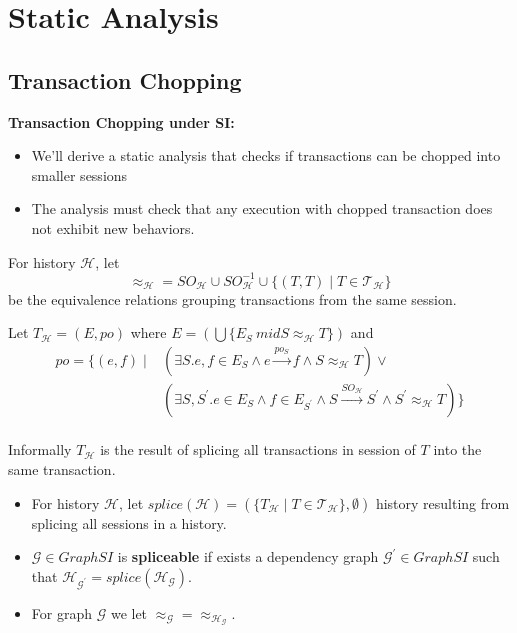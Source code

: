 \documentclass{beamer}
\begin{document}
\section{Static Analysis}
\subsection{Transaction Chopping}

\begin{frame}
	\textbf{Transaction Chopping under SI:}
	\begin{itemize}
		\item We'll derive a static analysis that checks if transactions can be chopped into smaller sessions
		\item The analysis must check that any execution with chopped transaction does not exhibit new behaviors.
	\end{itemize}
\end{frame}


\begin{frame}
	For history $\mathcal{H}$, let
	$$ \approx_\mathcal{H} = SO_\mathcal{H} \cup SO^{-1}_\mathcal{H} \cup \{ (T,T) \mid T \in \mathcal{T}_\mathcal{H}\}$$
	be the equivalence relations grouping transactions from the same session.
\end{frame}

\begin{frame}
	Let $\boxed{T}_\mathcal{H} = (E, po)$ where 
	$ E = \left(\bigcup \{E_S \ mid S \approx_\mathcal{H} T \} \right) $
	and
	$$
	\begin{aligned}
		po = \{ (e,f) \mid & \left( \exists S . e,f \in E_S \wedge e \xrightarrow{po_S} f \wedge S \approx_\mathcal{H} T \right) \vee \\ 
		                   & \left( \exists S, S^\prime . e\in E_S \wedge f \in E_{S^\prime} \wedge S \xrightarrow{SO_\mathcal{H}} S^\prime \wedge S^\prime \approx_\mathcal{H} T \right) \}
	\end{aligned}
	$$
	\\
	Informally $\boxed{T}_\mathcal{H}$ is the result of splicing all transactions in session of $T$ into the same transaction.
\end{frame}

\begin{frame}
	\begin{itemize}
		\item	For history $\mathcal{H}$, let $splice(\mathcal{H})=\left( \{ \boxed{T}_\mathcal{H} \mid T \in \mathcal{T}_\mathcal{H} \}, \emptyset \right)$ history resulting from splicing all sessions in a history.
		\item $\mathcal{G} \in GraphSI $ is \textbf{spliceable} if exists a dependency graph $ \mathcal{G}^\prime \in GraphSI $ such that $ \mathcal{H}_{\mathcal{G}^\prime} = splice(\mathcal{H}_\mathcal{G})$.
		\item For graph $\mathcal{G}$ we let $\approx_\mathcal{G} = \approx_{\mathcal{H}_\mathcal{G}}$.
	\end{itemize}
\end{frame}
\end{document}
